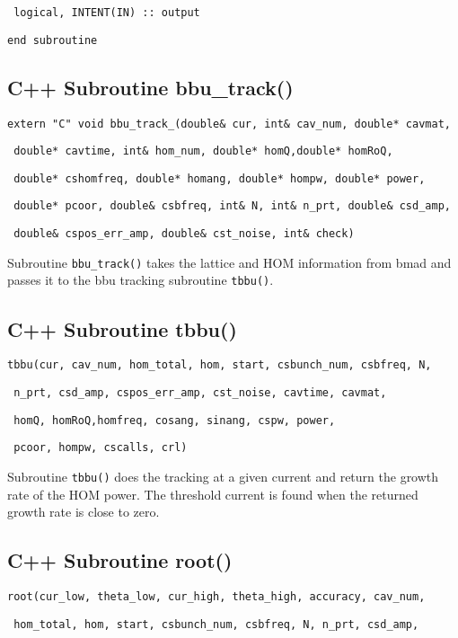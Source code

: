 \documentclass[12pt]{article}
\begin{document}
\texttt{    logical, INTENT(IN) :: output}

\texttt{end subroutine}

\subsection{C++ Subroutine bbu\_track()}

\texttt{extern "C" void bbu\_track\_(double\& cur, int\& cav\_num, double* cavmat,}

\texttt{                             double* cavtime, int\& hom\_num, double* homQ,double* homRoQ,}

\texttt{			     double* cshomfreq, double* homang, double* hompw, double* power,}
 
\texttt{                             double* pcoor, double\& csbfreq, int\& N, int\& n\_prt, double\& csd\_amp,}

\texttt{                             double\& cspos\_err\_amp, double\& cst\_noise, int\& check)}

Subroutine \texttt{bbu\_track()} takes the lattice and HOM information from bmad and passes it 
to the bbu tracking subroutine \texttt{tbbu()}.

\subsection{C++ Subroutine tbbu()}

\texttt{tbbu(cur, cav\_num, hom\_total, hom, start, csbunch\_num, csbfreq, N,}

\texttt{     n\_prt, csd\_amp, cspos\_err\_amp, cst\_noise, cavtime, cavmat,}

\texttt{     homQ, homRoQ,homfreq, cosang, sinang, cspw, power, }

\texttt{     pcoor, hompw, cscalls, crl)}

Subroutine \texttt{tbbu()} does the tracking at a given current and return the growth rate of 
the HOM power. The threshold current is found when the returned growth rate is 
close to zero.

\subsection{C++ Subroutine root()}

\texttt{root(cur\_low, theta\_low, cur\_high, theta\_high, accuracy, cav\_num,}

\texttt{     hom\_total, hom, start, csbunch\_num, csbfreq, N,  n\_prt, csd\_amp,}
\end{document}
